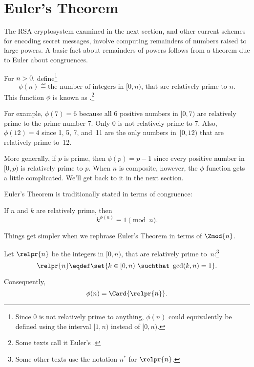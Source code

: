 \section{Euler's Theorem}\label{Euler_sec}

The RSA cryptosystem examined in the next section, and other current
schemes for encoding secret messages, involve computing remainders of
numbers raised to large powers.  A basic fact about remainders of
powers follows from a theorem due to Euler about congruences.

\begin{definition}
For $n>0$, define\footnote{Since 0 is not relatively prime to
  anything, $\phi(n)$ could equivalently be defined using the
  interval $[1,n)$ instead of $[0,n)$.}
\[
\phi(n) \eqdef \text{the number of integers in $[0, n)$, that are relatively prime
  to~$n$.}
\]
This function $\phi$ is known as .\footnote{Some texts call it Euler's .}
\end{definition}

For example, $\phi(7) = 6$ because all 6 positive numbers in $[0,7)$
  are relatively prime to the prime number 7.  Only 0 is not
  relatively prime to 7.   Also, $\phi(12) = 4$ since 1, 5, 7,
  and~11 are the only numbers in~$[0, 12)$ that are relatively prime
    to~12.

More generally, if $p$ is prime, then $\phi(p) = p - 1$ since every
positive number in $[0,p)$ is relatively prime to $p$.  When $n$ is
  composite, however, the $\phi$ function gets a little complicated.
  We'll get back to it in the next section.

Euler's Theorem is traditionally stated in terms of congruence:
\begin{theorem*}
If $n$ and $k$ are relatively prime, then
\begin{equation}\label{cong:euler}
k^{\phi(n)} \equiv 1 \pmod{n}.
\end{equation}
\end{theorem*}

Things get simpler when we rephrase Euler's Theorem in terms of
$\Zmod{n}$.

\begin{definition}
Let $\relpr{n}$  be the integers in $[0, n)$, that are relatively
  prime to~$n$:\footnote{Some other texts use the notation $n^*$ for
  $\relpr{n}$.}
\begin{equation}\label{def:relpr}
\relpr{n} \eqdef \set{k \in [0,n)\ \suchthat\ \gcd(k,n) = 1}.
\end{equation}
\end{definition}
Consequently,
\[
\phi(n) = \Card{\relpr{n}}.
\]

